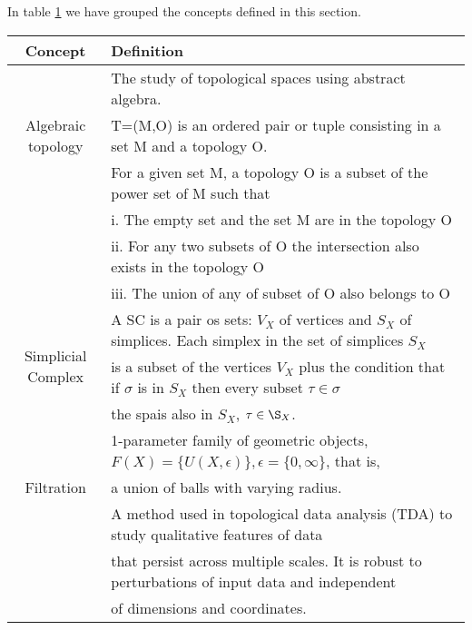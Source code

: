 \documentclass[onecollarge,runningheads]{svjour2}
\begin{document}
In table \ref{table:table} we have grouped the concepts defined in this section.
\begin{table}[htbp]
\begin{center}
\begin{tabular}{|c|l|}
\hline
 Concept & Definition\\ \hline
\multirow{3}{*}{Algebraic topology}
 & {The study of topological spaces using abstract algebra.}  \\
 \hline
\multirow{3}{*}{Topological space}
 & {T=(M,O) is an ordered pair or tuple consisting in a set M and a topology O.}  \\
 \hline
 \multirow{3}{*}{Topology}
 & {For a given set M, a topology O is a subset of the power set of M such that} \\
 & {i. The empty set and the set M are in the topology O }  \\
 & {ii. For any two subsets of O the intersection also exists in the topology O } \\
 & {iii. The union of any of subset of O also belongs to O} \\
 \hline
\multirow{3}{*}{Simplicial Complex}
 & {A SC is a pair os sets: $V_X$ of vertices and $S_X$ of simplices. Each simplex in the set of simplices $S_X$ }  \\
 & {is a subset of the vertices $V_X$ plus the condition that if $\sigma$ is in $S_X$ then every subset $\tau \in \sigma$ }  \\
 & the spais also in $S_X$, $\tau \in \S_X$.\\
 \hline
  \multirow{3}{*}{Filtration}
 & {1-parameter family of geometric objects, $F(X) = \{U(X, \epsilon)\}, \epsilon = \{ 0, \infty\}$, that is, }  \\
 & {a union of balls with varying radius.}  \\
 \hline\multirow{3}{*}{Persistent Homology}
 & {A method used in topological data analysis (TDA) to study qualitative features of data }  \\
 & {that persist across multiple scales. It is robust to perturbations of input data and  independent}  \\
 & {of dimensions and coordinates.} \\
 \hline
\end{tabular}
\label{table:table}
\end{center}
\end{table}
\end{document}
